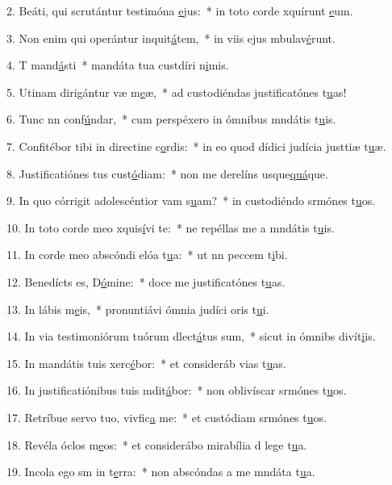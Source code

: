 2. Beáti, qui scrutántur testimóna \uline{e}jus:~* in toto corde xquírunt \uline{e}um.\par 
3. Non enim qui operántur inquit\uline{á}tem,~* in viis ejus mbulav\uline{é}runt.\par 
4. T mand\uline{á}sti~* mandáta tua custdíri n\uline{i}mis.\par 
5. Utinam dirigántur væ m\uline{e}æ,~* ad custodiéndas justificatónes t\uline{u}as!\par 
6. Tunc nn conf\uline{ú}ndar,~* cum perspéxero in ómnibus mndátis t\uline{u}is.\par 
7. Confitébor tibi in directine c\uline{o}rdis:~* in eo quod dídici judícia justtiæ t\uline{u}æ.\par 
8. Justificatiónes tus cust\uline{ó}diam:~* non me derelíns usque\uline{quá}que.\par 
9. In quo córrigit adolescéntior vam s\uline{u}am?~* in custodiéndo srmónes t\uline{u}os.\par 
10. In toto corde meo xquis\uline{í}vi te:~* ne repéllas me a mndátis t\uline{u}is.\par 
11. In corde meo abscóndi elóa t\uline{u}a:~* ut nn peccem t\uline{i}bi.\par 
12. Benedícts es, D\uline{ó}mine:~* doce me justificatónes t\uline{u}as.\par 
13. In lábis m\uline{e}is,~* pronuntiávi ómnia judíci oris t\uline{u}i.\par 
14. In via testimoniórum tuórum dlect\uline{á}tus sum,~* sicut in ómnibs divít\uline{i}is.\par 
15. In mandátis tuis xerc\uline{é}bor:~* et consideráb vias t\uline{u}as.\par 
16. In justificatiónibus tuis mdit\uline{á}bor:~* non oblivíscar srmónes t\uline{u}os.\par 
17. Retríbue servo tuo, vivfic\uline{a} me:~* et custódiam srmónes t\uline{u}os.\par 
18. Revéla óclos m\uline{e}os:~* et considerábo mirabília d lege t\uline{u}a.\par 
19. Incola ego sm in t\uline{e}rra:~* non abscóndas a me mndáta t\uline{u}a.\par 
